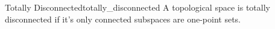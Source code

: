 \begin{definition}{Totally Disconnected}{totally_disconnected}
    A topological space is totally disconnected if it's only connected subspaces are one-point sets.
\end{definition}
